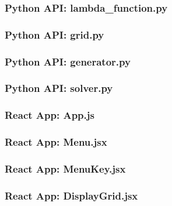 \documentclass[titlepage]{article}
\begin{document}
\subsubsection{Python API: lambda\_function.py}


\subsubsection{Python API: grid.py}


\subsubsection{Python API: generator.py}


\subsubsection{Python API: solver.py}


\subsubsection{React App: App.js}


\subsubsection{React App: Menu.jsx}


\subsubsection{React App: MenuKey.jsx}


\subsubsection{React App: DisplayGrid.jsx}

\end{document}
